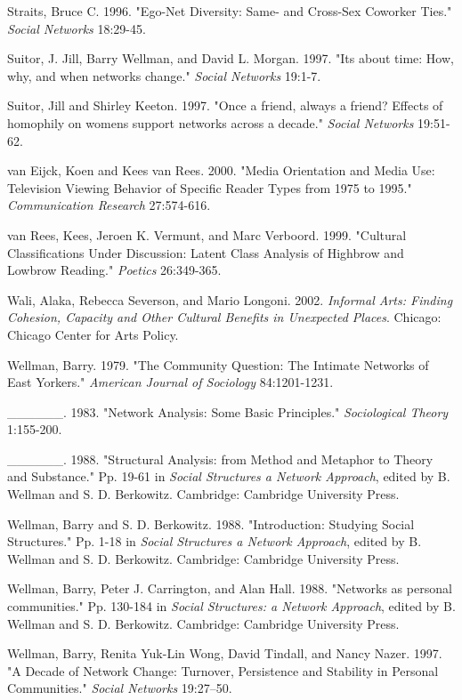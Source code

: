 Straits, Bruce C. 1996. "Ego-Net Diversity: Same- and Cross-Sex Coworker Ties." \emph{Social Networks} 18:29-45.

Suitor, J. Jill, Barry Wellman, and David L. Morgan. 1997. "It\textquotesingle s about time: How, why, and when networks change." \emph{Social Networks} 19:1-7.

Suitor, Jill and Shirley Keeton. 1997. "Once a friend, always a friend? Effects of homophily on women\textquotesingle s support networks across a decade." \emph{Social Networks} 19:51-62.

van Eijck, Koen and Kees van Rees. 2000. "Media Orientation and Media Use: Television Viewing Behavior of Specific Reader Types from 1975 to 1995." \emph{Communication Research} 27:574-616.

van Rees, Kees, Jeroen K. Vermunt, and Marc Verboord. 1999. "Cultural Classifications Under Discussion: Latent Class Analysis of Highbrow and Lowbrow Reading." \emph{Poetics} 26:349-365.

Wali, Alaka, Rebecca Severson, and Mario Longoni. 2002. \emph{Informal Arts: Finding Cohesion, Capacity and Other Cultural Benefits in Unexpected Places}. Chicago: Chicago Center for Arts Policy.

Wellman, Barry. 1979. "The Community Question: The Intimate Networks of East Yorkers." \emph{American Journal of Sociology} 84:1201-1231.

\_\_\_\_\_\_. 1983. "Network Analysis: Some Basic Principles." \emph{Sociological Theory} 1:155-200.

\_\_\_\_\_\_. 1988. "Structural Analysis: from Method and Metaphor to Theory and Substance." Pp. 19-61 in \emph{Social Structures a Network Approach}, edited by B. Wellman and S. D. Berkowitz. Cambridge: Cambridge University Press.

Wellman, Barry and S. D. Berkowitz. 1988. "Introduction: Studying Social Structures." Pp. 1-18 in \emph{Social Structures a Network Approach}, edited by B. Wellman and S. D. Berkowitz. Cambridge: Cambridge University Press.

Wellman, Barry, Peter J. Carrington, and Alan Hall. 1988. "Networks as personal communities." Pp. 130-184 in \emph{Social Structures: a Network Approach}, edited by B. Wellman and S. D. Berkowitz. Cambridge: Cambridge University Press.

Wellman, Barry, Renita Yuk-Lin Wong, David Tindall, and Nancy Nazer. 1997. "A Decade of Network Change: Turnover, Persistence and Stability in Personal Communities." \emph{Social Networks} 19:27--50.

